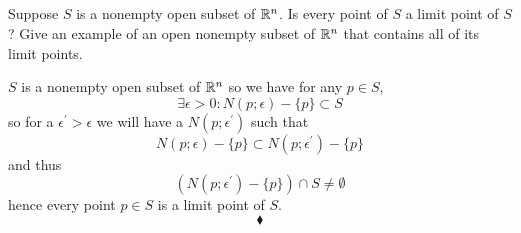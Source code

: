 \subsection{}
\begin{tcolorbox}

Suppose $S$ is a nonempty open subset of $\mathbb{R}^n$. Is every point of $S$ a limit point of $S$? Give an example of an open nonempty subset of $\mathbb{R}^n$ that contains all of its limit points.
\end{tcolorbox}
$S$ is a nonempty open subset of $\mathbb{R}^n$ so we have for any $p\in S$,
$$\exists \epsilon>0: N(p;\epsilon)-\{p\}\subset S$$
so for a $\epsilon^{'}>\epsilon$ we will have a $N(p;\epsilon^{'})$ such that 
$$N(p;\epsilon)- \{p\}\subset N(p;\epsilon^{'})- \{p\}$$
and thus 
$$(N(p;\epsilon^{'})- \{p\})\cap S\neq \emptyset$$
hence every point $p\in S$ is a limit point of $S$.
$$\blacklozenge$$\\


